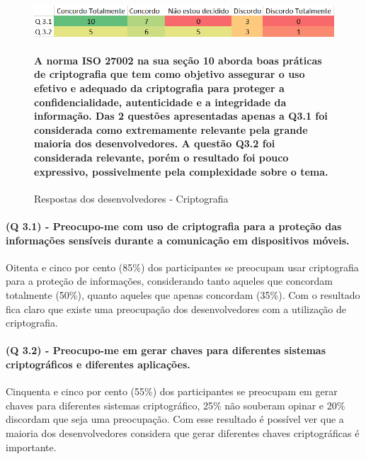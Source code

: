\begin{figure}[H]
\includegraphics[scale=0.7]{fig/Mapa de calor 2.PNG}
\caption{Respostas dos desenvolvedores - Criptografia}
\label{fig:2}
\paragraph{A norma ISO 27002 na sua seção 10 aborda boas práticas de criptografia que tem como objetivo assegurar o uso efetivo e adequado da criptografia para proteger a confidencialidade, autenticidade e a integridade da informação.  Das 2 questões apresentadas apenas a Q3.1 foi considerada como extremamente relevante pela grande maioria dos desenvolvedores. A questão Q3.2 foi considerada relevante, porém o resultado foi pouco expressivo, possivelmente pela complexidade sobre o tema.}
\end{figure}

\paragraph{\textbf{(Q 3.1)} - Preocupo-me com uso de criptografia para a proteção das informações sensíveis durante a comunicação em dispositivos móveis.}

Oitenta e cinco por cento (85{\%}) dos participantes se preocupam usar criptografia para a proteção de informações, considerando tanto aqueles que concordam totalmente (50{\%}), quanto aqueles que apenas concordam (35{\%}). Com o resultado fica claro que existe uma preocupação dos desenvolvedores com a utilização de criptografia.

\paragraph{\textbf{(Q 3.2)} - Preocupo-me em gerar chaves para diferentes sistemas criptográficos e diferentes aplicações.}

Cinquenta e cinco por cento (55{\%}) dos participantes se preocupam em gerar chaves para diferentes sistemas criptográfico, 25{\%} não souberam opinar e 20{\%} discordam que seja uma preocupação. Com esse resultado é possível ver que a maioria dos desenvolvedores considera que gerar diferentes chaves criptográficas é importante.
 
